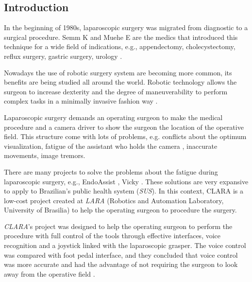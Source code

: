 \documentclass{svproc}
\begin{document}
	\begin{multicols}{2}
		
	\section{Introduction}
	
	
	In the beginning of 1980s, laparoscopic surgery was migrated from diagnostic to a surgical procedure. Semm K and Muehe E are the medics that introduced this technique for a wide field of indications, e.g., appendectomy, cholecystectomy, reflux surgery, gastric surgery, urology \cite{pmid26713285}. 
	
	Nowadays the use of robotic surgery system are becoming more common, its benefits are being studied all around the world. Robotic technology allows the surgeon to increase dexterity and the degree of maneuverability to perform complex tasks in a minimally invasive fashion way \cite{doi:10.3109/10929088.2010.541620}. 
	
	
 	Laparoscopic surgery demands an operating surgeon to make the medical procedure and a camera driver to show the surgeon the location of the operative field. This structure come with lots of problems, e.g. conflicts about the optimum visualization, fatigue of the assistant who holds the camera \cite{pmid28643066}, inaccurate movements, image tremors.
 	
 	There are many projects to solve the problems about the fatigue during laparoscopic surgery, e.g., EndoAssist \cite{pmid25484949}, Vicky \cite{pmid17867952}. These solutions are very expansive to apply to Brazilian's public health system (\textit{SUS}). In this context, CLARA is a low-cost project created at \textit{LARA} (Robotics and Automation Laboratory, University of Brasilia) to help the operating surgeon to procedure the surgery.
 	
 	
 	\textit{CLARA}'s project was designed to help the operating surgeon to perform the procedure with full control of the tools through effective interfaces, voice recognition and a joystick linked with the laparoscopic grasper. The voice control was compared with foot pedal interface, and they concluded that voice control was more accurate and had the advantage of not requiring the surgeon to look away from the operative field \cite{pmid16844449}. 
 	

\end{multicols}
\end{document}

